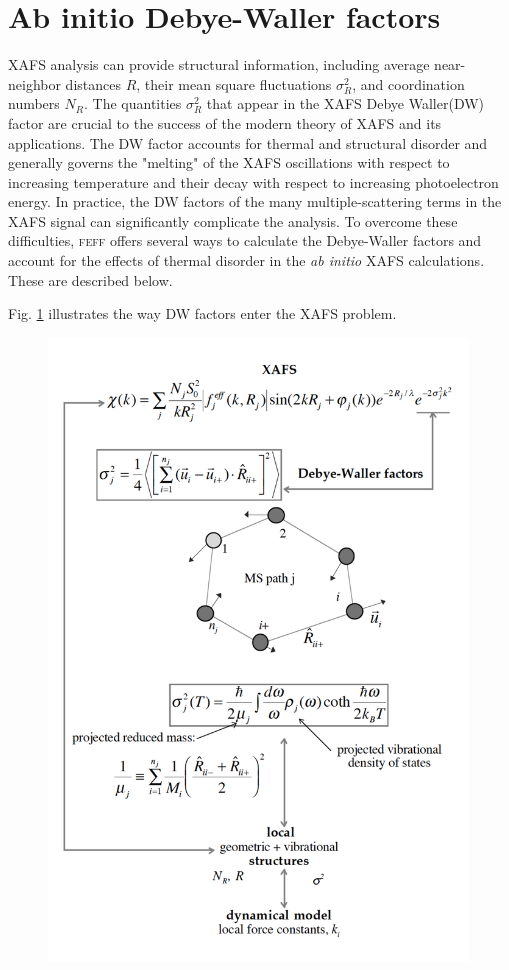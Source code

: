 \documentclass[11pt,oneside]{report} %
\newcommand{\program}[1]{\textsc{#1}}
\newcommand{\feff}{\program{feff}}
\begin{document}

\section{Ab initio Debye-Waller factors}
\label{sec:DWfactors}
XAFS analysis can provide structural information, including average near-neighbor distances $R$, their mean square fluctuations $\sigma_{R}^{2} $, and coordination numbers $N_R$.  The quantities $\sigma_{R}^{2} $ that appear in the XAFS Debye Waller(DW) factor are crucial to the success of the modern theory of XAFS and its applications.  The DW factor accounts for thermal and structural disorder and generally governs the "melting" of the XAFS oscillations with respect to increasing temperature and their decay with respect to increasing photoelectron energy.  In practice, the DW factors of the many multiple-scattering terms in the XAFS signal can significantly complicate the analysis.  To overcome these difficulties, {\feff} offers several ways to calculate the Debye-Waller factors and account for the effects of thermal disorder in the {\it ab initio} XAFS calculations.  These are described below.

Fig. \ref{fig:DWschema} illustrates the way DW factors enter the XAFS problem.

\begin{figure}[H]
	\centering
		\includegraphics[height=6.5in]{annafig1.pdf}
	\label{fig:DWschema}
\end{figure}
\end{document}
